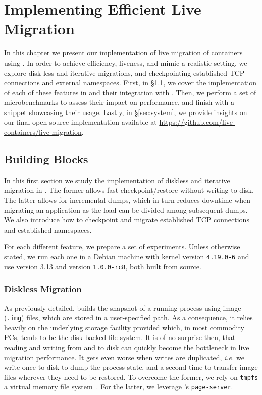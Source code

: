 \chapter{Implementing Efficient Live Migration} \label{chap:system}

In this chapter we present our implementation of live migration of \runc containers using \criu.
In order to achieve efficiency, liveness, and mimic a realistic setting, we explore disk-less and iterative migrations, and checkpointing established TCP connections and external namespaces.
First, in \S\ref{sec:arch-blocks}, we cover the implementation of each of these features in \criu and their integration with \runc.
Then, we perform a set of microbenchmarks to assess their impact on performance, and finish with a snippet showcasing their usage.
Lastly, in \S\ref{sec:system}, we provide insights on our final open source implementation available at \url{https://github.com/live-containers/live-migration}.

\section{Building Blocks} \label{sec:arch-blocks}

In this first section we study the implementation of diskless and iterative migration in \criu.
The former allows fast checkpoint/restore without writing to disk.
The latter allows for incremental dumps, which in turn reduces downtime when migrating an application as the load can be divided among subsequent dumps.
We also introduce how to checkpoint and migrate established TCP connections and established namespaces.

For each different feature, we prepare a set of experiments.
Unless otherwise stated, we run each one in a Debian machine with kernel version \texttt{4.19.0-6} and use \criu version 3.13 and \runc version \texttt{1.0.0-rc8}, both built from source.

\subsection{Diskless Migration}

As previously detailed, \criu builds the snapshot of a running process using image (\texttt{.img}) files, which are stored in a user-specified path.
As a consequence, it relies heavily on the underlying storage facility provided which, in most commodity PCs, tends to be the disk-backed file system.
It is of no surprise then, that reading and writing from and to disk can quickly become the bottleneck in live migration performance.
It gets even worse when writes are duplicated, \textit{i.e.} we write once to disk to dump the process state, and a second time to transfer image files wherever they need to be restored.
To overcome the former, we rely on \texttt{tmpfs} a virtual memory file system~\cite{tmpfs-manpage}.
For the latter, we leverage \criu's \texttt{page-server}.

